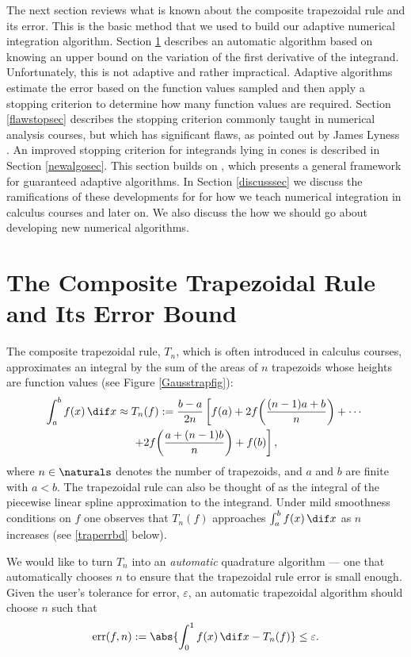 \documentclass[]{article}
\DeclareMathOperator{\err}{err}
\theoremstyle{definition}
\theoremstyle{remark}
\begin{document}
The next section reviews what is known about the composite trapezoidal rule and its error.  This is the basic method that we used to build our adaptive numerical integration algorithm.  Section \ref{traprulesec} describes an automatic algorithm based on knowing an upper bound on the variation of the first derivative of the integrand.  Unfortunately, this is not adaptive and rather impractical.  Adaptive algorithms estimate the error based on the function values sampled and then apply a stopping criterion to determine how many function values are required.  Section \ref{flawstopsec} describes the stopping criterion commonly taught in numerical analysis courses, but which has significant flaws, as pointed out by James Lyness .  An improved stopping criterion for integrands lying in cones is described in Section \ref{newalgosec}.  This section builds on , which presents a general framework for guaranteed adaptive algorithms.  In Section \ref{discusssec} we discuss the ramifications of these developments for for how we teach numerical integration in calculus courses and later on.  We also discuss the how we should go about developing new numerical algorithms.

\section{The Composite Trapezoidal Rule and Its Error Bound} \label{traprulesec}
The composite trapezoidal rule, $T_n$, which is often introduced in calculus courses, approximates an integral by the sum of the areas of $n$ trapezoids whose heights are function values (see Figure \ref{Gausstrapfig}):
\begin{multline}
\int_a^b f(x) \, \dif x \approx T_n(f) := \frac{b-a}{2n} \left [ f(a) + 2 f\biggl(\frac{(n-1)a+b}{n}\biggr) + \cdots  \right .\\
 \left . + 2 f\biggl(\frac{a+(n-1)b}{n}\biggr) + f(b) \right],
\end{multline}
where $n \in \naturals$ denotes the number of trapezoids, and $a$ and $b$ are finite with $a<b$.  The trapezoidal rule can also be thought of as the integral of the piecewise linear spline approximation to the integrand. Under mild smoothness conditions on $f$ one observes that $T_n(f)$ approaches $\int_a^b f(x) \, \dif x$ as $n$ increases (see \eqref{traperrbd} below). 

We would like to turn $T_n$ into an \emph{automatic} quadrature algorithm --- one that automatically chooses $n$ to ensure that the trapezoidal rule error is small enough.  Given the user's tolerance for error, $\varepsilon$, an automatic trapezoidal algorithm should choose $n$ such that 
\begin{equation} \label{errdef}
\err(f,n) := \abs{\int_0^1 f(x) \, \dif x - T_n(f)} \le \varepsilon.
\end{equation}
\end{document}
